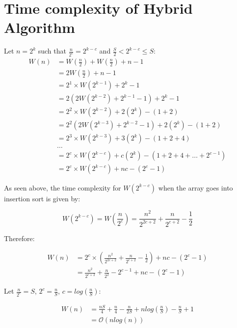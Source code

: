 \documentclass[10pt, a4paper]{article}
\begin{document}
\section{Time complexity of Hybrid Algorithm}
Let $n = 2^k$ such that $\frac{n}{2^c} = 2^{k-c}$ and $\frac{S}{2} < 2^{k-c} \leq S$:
\begin{equation*}
\begin{split}
W(n) & = W(\frac{n}{2}) + W(\frac{n}{2}) + n - 1 \\
& = 2W(\frac{n}{2}) + n - 1 \\
& = 2^1 \times W(2^{k-1}) + 2^k - 1 \\
& = 2(2W(2^{k-2}) + 2^{k-1} - 1) + 2^k - 1 \\
& = 2^2 \times W(2^{k-2}) + 2(2^k) - (1+2) \\
& = 2^2(2W(2^{k-3}) + 2^{k-2} - 1) + 2(2^k) - (1+2) \\
& = 2^3 \times W(2^{k-3}) + 3(2^k) - (1+2+4) \\
& \dots \\
& = 2^c \times W(2^{k-c}) + c(2^k) - (1+2+4+\dots+2^{c-1}) \\
& = 2^c \times W(2^{k-c}) + nc - (2^c-1) 
\end{split}
\end{equation*}

As seen above, the time complexity for $W(2^{k-c})$ when the array goes into insertion sort is given by:

\[ W(2^{k-c}) = W(\frac{n}{2^c}) = \frac{n^2}{2^{2c+2}} + \frac{n}{2^{c+2}} - \frac{1}{2} \]

Therefore:

\begin{equation*}
\begin{split}
W(n) & = 2^c \times (\frac{n^2}{2^{2c+2}} + \frac{n}{2^{c+2}} - \frac{1}{2}) + nc - (2^c-1) \\
& = \frac{n^2}{2^{c+2}} + \frac{n}{2^2} - 2^{c-1} + nc - (2^c-1)
\end{split}
\end{equation*}

Let $\frac{n}{2^c} = S$, $2^c = \frac{n}{S}$, $c = log(\frac{n}{S})$:

\begin{equation*}
\begin{split}
W(n) & = \frac{nS}{4} + \frac{n}{4} - \frac{n}{2S} + nlog(\frac{n}{S}) - \frac{n}{S} + 1\\
& = \mathcal{O}(nlog(n))
\end{split}
\end{equation*}
\end{document}
